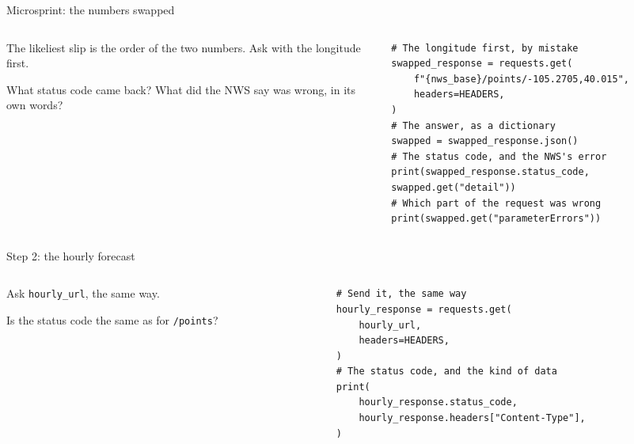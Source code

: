 \documentclass[9pt,aspectratio=169]{beamer}
\begin{document}
\begin{frame}[fragile]{Microsprint: the numbers swapped}
    \begin{columns}[T]
        \begin{column}{0.37\textwidth}
            The likeliest slip is the order of the two numbers. Ask with the longitude first.

            \medskip
            What status code came back? What did the NWS say was wrong, in its own words?
        \end{column}
        \begin{column}{0.6\textwidth}
\begin{lstlisting}
# The longitude first, by mistake
swapped_response = requests.get(
    f"{nws_base}/points/-105.2705,40.015",
    headers=HEADERS,
)
# The answer, as a dictionary
swapped = swapped_response.json()
# The status code, and the NWS's error
print(swapped_response.status_code, swapped.get("detail"))
# Which part of the request was wrong
print(swapped.get("parameterErrors"))
\end{lstlisting}
        \end{column}
    \end{columns}
\end{frame}

\begin{frame}[fragile]{Step 2: the hourly forecast}
    \begin{columns}[T]
        \begin{column}{0.37\textwidth}
            Ask \texttt{hourly\_url}, the same way.

            \medskip
            Is the status code the same as for \texttt{/points}?
        \end{column}
        \begin{column}{0.6\textwidth}
\begin{lstlisting}
# Send it, the same way
hourly_response = requests.get(
    hourly_url,
    headers=HEADERS,
)
# The status code, and the kind of data
print(
    hourly_response.status_code,
    hourly_response.headers["Content-Type"],
)
\end{lstlisting}
        \end{column}
    \end{columns}
\end{frame}
\end{document}
